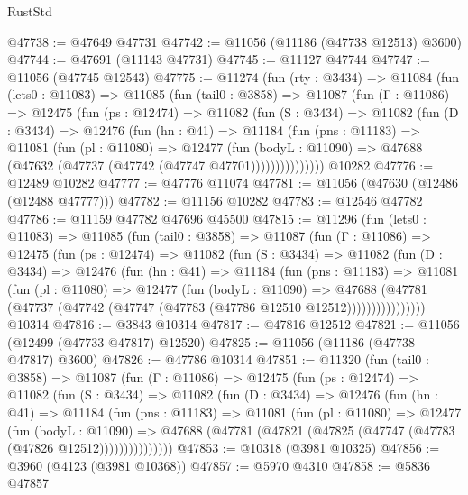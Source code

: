 \begin{lexlean}{RustStd}
\begin{coremodule}
@47738 := @47649 @47731
@47742 := @11056 (@11186 (@47738 @12513) @3600)
@47744 := @47691 (@11143 @47731)
@47745 := @11127 @47744
@47747 := @11056 (@47745 @12543)
@47775 := @11274
    (fun (rty : @3434) =>
    @11084
      (fun (lets0 : @11083) =>
      @11085
        (fun (tail0 : @3858) =>
        @11087
          (fun (Γ : @11086) =>
          @12475
            (fun (ps : @12474) =>
            @11082
              (fun (S : @3434) =>
              @11082
                (fun (D : @3434) =>
                @12476
                  (fun (hn : @41) =>
                  @11184
                    (fun (pns : @11183) =>
                    @11081
                      (fun (pl : @11080) =>
                      @12477
                        (fun (bodyL : @11090) =>
                        @47688 (@47632 (@47737 (@47742 (@47747 @47701)))))))))))))))
    @10282
@47776 := @12489 @10282
@47777 := @47776 @11074
@47781 := @11056 (@47630 (@12486 (@12488 @47777)))
@47782 := @11156 @10282
@47783 := @12546 @47782
@47786 := @11159 @47782 @47696 @45500
@47815 := @11296
    (fun (lets0 : @11083) =>
    @11085
      (fun (tail0 : @3858) =>
      @11087
        (fun (Γ : @11086) =>
        @12475
          (fun (ps : @12474) =>
          @11082
            (fun (S : @3434) =>
            @11082
              (fun (D : @3434) =>
              @12476
                (fun (hn : @41) =>
                @11184
                  (fun (pns : @11183) =>
                  @11081
                    (fun (pl : @11080) =>
                    @12477
                      (fun (bodyL : @11090) =>
                      @47688
                        (@47781
                          (@47737 (@47742 (@47747 (@47783 (@47786 @12510 @12512))))))))))))))))
    @10314
@47816 := @3843 @10314
@47817 := @47816 @12512
@47821 := @11056 (@12499 (@47733 @47817) @12520)
@47825 := @11056 (@11186 (@47738 @47817) @3600)
@47826 := @47786 @10314
@47851 := @11320
    (fun (tail0 : @3858) =>
    @11087
      (fun (Γ : @11086) =>
      @12475
        (fun (ps : @12474) =>
        @11082
          (fun (S : @3434) =>
          @11082
            (fun (D : @3434) =>
            @12476
              (fun (hn : @41) =>
              @11184
                (fun (pns : @11183) =>
                @11081
                  (fun (pl : @11080) =>
                  @12477
                    (fun (bodyL : @11090) =>
                    @47688 (@47781 (@47821 (@47825 (@47747 (@47783 (@47826 @12512)))))))))))))))
@47853 := @10318 (@3981 @10325)
@47856 := @3960 (@4123 (@3981 @10368))
@47857 := @5970 @4310
@47858 := @5836 @47857

\end{coremodule}
\end{lexlean}
